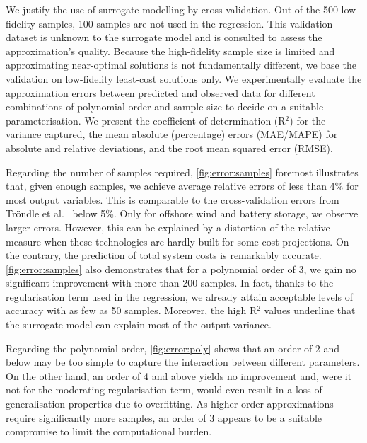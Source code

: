 We justify the use of surrogate modelling by cross-validation.
Out of the 500 low-fidelity samples,
100 samples are not used in the regression.
This validation dataset is unknown to the surrogate model and is
consulted to assess the approximation's quality.
Because the high-fidelity sample size is limited and
approximating near-optimal solutions is not fundamentally different,
we base the validation on low-fidelity least-cost solutions only.
We experimentally evaluate the approximation errors between predicted and observed data
for different combinations of polynomial order and sample size
to decide on a suitable parameterisation.
We present the coefficient of determination (R$^2$)
for the variance captured,
the mean absolute (percentage) errors (MAE/MAPE) for absolute and relative deviations,
and the root mean squared error (RMSE).

Regarding the number of samples required, \cref{fig:error:samples}
foremost illustrates that, given enough samples, we achieve
average relative errors of less than 4\% for most output variables.
This is comparable to the cross-validation errors from Tröndle et al.~\cite{trondle_trade-offs_2020} below 5\%.
Only for offshore wind and battery storage, we observe larger errors.
However, this can be explained by a distortion of the relative measure
when these technologies are hardly built for some cost projections.
On the contrary, the prediction of total system costs is remarkably accurate.
\cref{fig:error:samples} also demonstrates that for a polynomial order of 3,
we gain no significant improvement with more than 200 samples.
In fact, thanks to the regularisation term used in the regression,
we already attain acceptable levels of accuracy with as few as 50 samples.
Moreover, the high R$^2$ values underline that the surrogate model can explain 
most of the output variance.

Regarding the polynomial order, \cref{fig:error:poly} shows that
an order of 2 and below may be too simple to capture the
interaction between different parameters. On the other hand, 
an order of 4 and above yields no improvement and,
were it not for the moderating regularisation term,
would even result in a loss of generalisation properties due to overfitting.
As higher-order approximations require significantly more samples,
an order of 3 appears to be a suitable compromise
to limit the computational burden.

